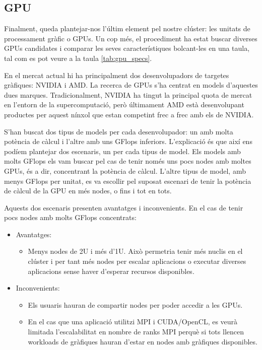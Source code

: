 \subsection{GPU}

Finalment, queda plantejar-nos l'últim element pel nostre clúster: les unitats de processament gràfic o GPUs. Un cop més, el procediment ha estat buscar diverses GPUs candidates i comparar les seves característiques bolcant-les en una taula, tal com es pot veure a la taula \ref{tab:gpu_specs}.



En el mercat actual hi ha principalment dos desenvolupadors de targetes gràfiques: NVIDIA i AMD. La recerca de GPUs s'ha centrat en models d'aquestes dues marques. Tradicionalment, NVIDIA ha tingut la principal quota de mercat en l'entorn de la supercomputació, però últimament AMD està desenvolupant productes per aquest nínxol que estan competint frec a frec amb els de NVIDIA.

S'han buscat dos tipus de models per cada desenvolupador: un amb molta potència de càlcul i l'altre amb uns GFlops inferiors. L'explicació és que així ens podíem plantejar dos escenaris, un per cada tipus de model. 
Els models amb molts GFlops els vam buscar pel cas de tenir només uns pocs nodes amb moltes GPUs, és a dir, concentrant la potència de càlcul.
L'altre tipus de model, amb menys GFlops per unitat, es va escollir pel suposat escenari de tenir la potència de càlcul de la GPU en més nodes, o fins i tot en tots.

Aquests dos escenaris presenten avantatges i inconvenients. En el cas de tenir pocs nodes amb molts GFlops concentrats:
\begin{itemize}
    \item Avantatges:
    \begin{itemize}
        \item Menys nodes de 2U i més d'1U. Això permetria tenir més nuclis en el clúster i per tant més nodes per escalar aplicacions o executar diverses aplicacions sense haver d'esperar recursos disponibles.
    \end{itemize}
    \item Inconvenients:
    \begin{itemize}
        \item Els usuaris hauran de compartir nodes per poder accedir a les GPUs. 
        \item En el cas que una aplicació utilitzi MPI i CUDA/OpenCL, es veurà limitada l'escalabilitat en nombre de ranks MPI perquè si tots llencen workloads de gràfiques hauran d'estar en nodes amb gràfiques disponibles.
    \end{itemize}
\end{itemize}

